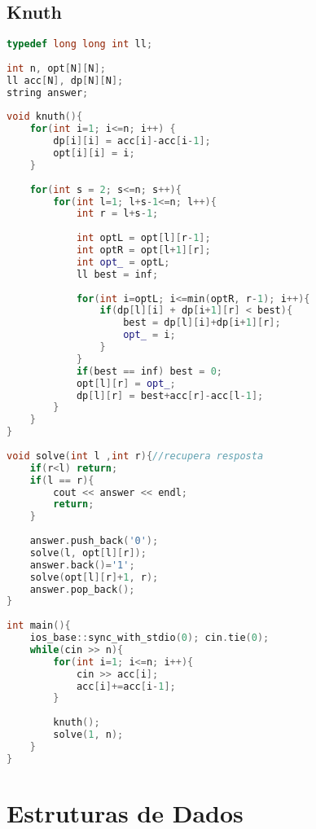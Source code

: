 \documentclass[12pt,a4paper,twoside]{report}
\begin{document}
\section{Knuth}
\noindent\begin{lstlisting}[caption=Knuth,language=C++]
typedef long long int ll;
 
int n, opt[N][N];
ll acc[N], dp[N][N];
string answer;
 
void knuth(){    
    for(int i=1; i<=n; i++) {
        dp[i][i] = acc[i]-acc[i-1];
        opt[i][i] = i;
    }
     
    for(int s = 2; s<=n; s++){
        for(int l=1; l+s-1<=n; l++){
            int r = l+s-1;
             
            int optL = opt[l][r-1];
            int optR = opt[l+1][r];
            int opt_ = optL;
            ll best = inf;
             
            for(int i=optL; i<=min(optR, r-1); i++){
                if(dp[l][i] + dp[i+1][r] < best){
                    best = dp[l][i]+dp[i+1][r];
                    opt_ = i;
                }
            }
            if(best == inf) best = 0;
            opt[l][r] = opt_;
            dp[l][r] = best+acc[r]-acc[l-1];
        }
    }
}
 
void solve(int l ,int r){//recupera resposta
    if(r<l) return;
    if(l == r){
        cout << answer << endl;
        return;
    }
     
    answer.push_back('0');
    solve(l, opt[l][r]);
    answer.back()='1';
    solve(opt[l][r]+1, r);
    answer.pop_back();
}
 
int main(){
    ios_base::sync_with_stdio(0); cin.tie(0);
    while(cin >> n){
        for(int i=1; i<=n; i++){
            cin >> acc[i];
            acc[i]+=acc[i-1];
        }
         
        knuth();
        solve(1, n);
    }
}
\end{lstlisting}

\chapter{Estruturas de Dados}
\end{document}
